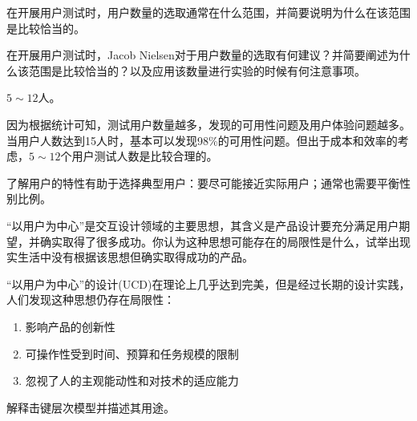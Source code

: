 \begin{problem}[2013、2023]
在开展用户测试时，用户数量的选取通常在什么范围，并简要说明为什么在该范围是比较恰当的。

在开展用户测试时，Jacob Nielsen对于用户数量的选取有何建议？并简要阐述为什么该范围是比较恰当的？以及应用该数量进行实验的时候有何注意事项。
\end{problem}

\begin{solution}
$5 \sim 12$人。

因为根据统计可知，测试用户数量越多，发现的可用性问题及用户体验问题越多。当用户人数达到15人时，基本可以发现98\%的可用性问题。但出于成本和效率的考虑，$5 \sim 12$个用户测试人数是比较合理的。

了解用户的特性有助于选择典型用户：要尽可能接近实际用户；通常也需要平衡性别比例。
\end{solution}



\begin{problem}[2013]
“以用户为中心”是交互设计领域的主要思想，其含义是产品设计要充分满足用户期望，并确实取得了很多成功。你认为这种思想可能存在的局限性是什么，试举出现实生活中没有根据该思想但确实取得成功的产品。
\end{problem}

\begin{solution}
“以用户为中心”的设计(UCD)在理论上几乎达到完美，但是经过长期的设计实践，人们发现这种思想仍存在局限性：
\vspace{-0.8em}
\begin{multicols}{2}
    \begin{enumerate}[label=\arabic*.]
        \item 影响产品的创新性
        \item 可操作性受到时间、预算和任务规模的限制
        \item 忽视了人的主观能动性和对技术的适应能力
    \end{enumerate}
\end{multicols}
\vspace{-1em}
\end{solution}



\begin{problem}[2013]
解释击键层次模型并描述其用途。
\end{problem}

